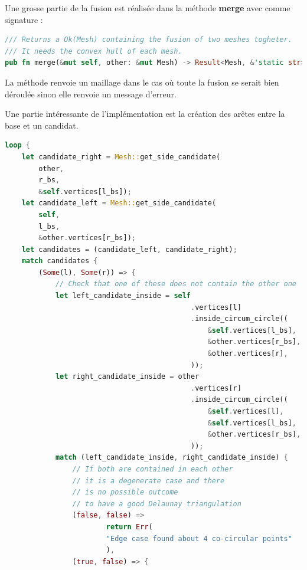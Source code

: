 Une grosse partie de la fusion est réalisée dans la méthode \textbf{merge} avec comme signature : 
\begin{lstlisting}[language=Rust, style=boxed]
/// Returns a Ok(Mesh) containing the fusion of two meshes togheter.
/// It needs the convex hull of each mesh.
pub fn merge(&mut self, other: &mut Mesh) -> Result<Mesh, &'static str>;
\end{lstlisting}

La méthode renvoie un maillage dans le cas où toute la fusion se serait bien déroulée sinon elle renvoie un message d'erreur.

Une partie intéressante de l'implémentation est la création des arêtes entre la base et un candidat.

\begin{lstlisting}[language=Rust, style=boxed]
loop {
    let candidate_right = Mesh::get_side_candidate(
        other,
        r_bs,
        &self.vertices[l_bs]);
    let candidate_left = Mesh::get_side_candidate(
        self,
        l_bs,
        &other.vertices[r_bs]);
    let candidates = (candidate_left, candidate_right);
    match candidates {
        (Some(l), Some(r)) => {
            // Check that one of these does not contain the other one
            let left_candidate_inside = self
                                            .vertices[l]
                                            .inside_circum_circle((
                                                &self.vertices[l_bs],
                                                &other.vertices[r_bs],
                                                &other.vertices[r],
                                            ));
            let right_candidate_inside = other
                                            .vertices[r]
                                            .inside_circum_circle((
                                                &self.vertices[l],
                                                &self.vertices[l_bs],
                                                &other.vertices[r_bs],
                                            ));
            match (left_candidate_inside, right_candidate_inside) {
                // If both are contained in each other
                // it is a degenerate case and there
                // is no possible outcome
                // to have a good Delaunay triangulation
                (false, false) => 
                        return Err(
                        "Edge case found about 4 co-circular points"
                        ),
                (true, false) => {

\end{lstlisting}
